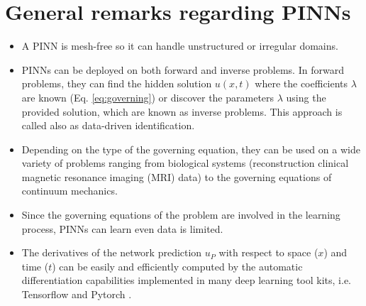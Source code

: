\section{General remarks regarding PINNs}
\begin{itemize}
    \item A PINN is mesh-free so it can handle unstructured or irregular domains.
    \item PINNs can be deployed on both forward and inverse problems. In forward problems, they can find the hidden solution
    $u(x,t)$ 
    where the coefficients $\lambda$ are known (Eq. \ref{eq:governing}) or discover
    the parameters $\lambda$ using the provided solution, which are known as inverse problems. This approach
    is called also as data-driven identification.
    \item Depending on the type of the governing equation, they can be used on a wide variety of problems ranging from biological
    systems (reconstruction clinical magnetic resonance imaging (MRI) data) to the governing equations of continuum mechanics.
    \item Since the governing equations of the problem are involved in the learning process, PINNs can learn even data is limited.
    \item The derivatives of the network prediction $u_{P}$ with respect to space ($x$) and time ($t$) can be easily and
    efficiently computed by the automatic differentiation capabilities implemented in many deep learning tool kits, i.e. Tensorflow 
    \cite{abadi2016tensorflow} and 
    Pytorch \cite{NEURIPS20199015}.
    
\end{itemize}


















